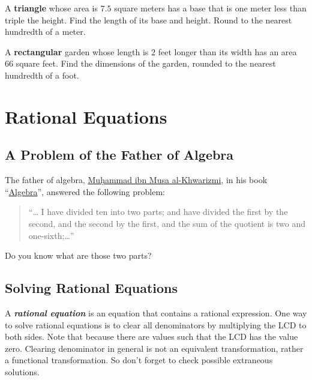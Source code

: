 \documentclass[
  en,11pt]{elegantbook}
\newcommand{\size}[2]{{\fontsize{#1}{0}\selectfont#2}}
\renewenvironment{exercise}[1][]{
    \refstepcounter{exer}
    \par\noindent
    \makebox[-3pt][r]{\color{red!90}\size{12}{\HandPencilLeft}}
	\textbf{\color{main}{\exercisename} \theexer #1}
    \rmfamily
}{\par\ignorespacesafterend}
\newenvironment{rmdthink}{
	\vspace*{0.5\baselineskip}
	\par\noindent
	\makebox[-4pt][r]{\color{green!90}\size{12}{\faLightbulbO}\,\,}
    \begin{tcolorbox}[
    enhanced,
    title={\textbf{\color{second}Think}},
    title style={left color=blue!10!green!20!white,right color=yellow!20!blue!20!white},
    colback=green!20!white,
    ]
    \sffamily
}{
    \end{tcolorbox}
	\par\ignorespacesafterend
}
\begin{document}
\begin{exercise}
A \textbf{triangle} whose area is \(7.5\) square meters has a base that is one meter less than triple the height. Find the length of its base and height. Round to the nearest hundredth of a meter.
\end{exercise}

\begin{exercise}
A \textbf{rectangular} garden whose length is \(2\) feet longer than its width has an area 66 square feet. Find the dimensions of the garden, rounded to the nearest hundredth of a foot.
\end{exercise}

\hypertarget{rational-equations}{%
\chapter{Rational Equations}\label{rational-equations}}

\hypertarget{a-problem-of-the-father-of-algebra}{%
\section{A Problem of the Father of Algebra}\label{a-problem-of-the-father-of-algebra}}

\begin{rmdthink}

The father of algebra, \href{https://en.wikipedia.org/wiki/Muhammad_ibn_Musa_al-Khwarizmi\#Algebra}{Muḥammad ibn Musa al-Khwarizmi}, in his book ``\href{https://archive.org/details/algebraofmohamme00khuwrich/page/44/mode/2up}{Algebra}'', answered the following problem:

\begin{quote}
``\ldots{} I have divided ten into two parts; and have divided the first by the second, and the second by the first, and the sum of the quotient is two and one-sixth;\ldots{}''
\end{quote}

Do you know what are those two parts?

\end{rmdthink}

\hypertarget{solving-rational-equations}{%
\section{Solving Rational Equations}\label{solving-rational-equations}}

A \textbf{\emph{rational equation}} is an equation that contains a rational expression. One way to solve rational equations is to clear all denominators by multiplying the LCD to both sides. Note that because there are values such that the LCD has the value zero. Clearing denominator in general is not an equivalent transformation, rather a functional transformation. So don't forget to check possible extraneous solutions.
\end{document}
